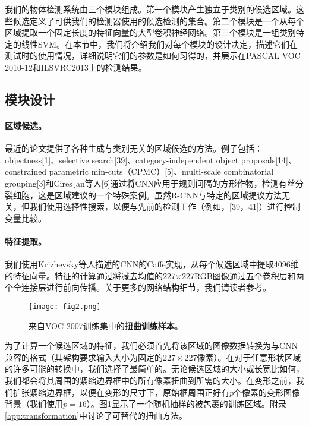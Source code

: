 \documentclass[../main.tex]{subfile}
\begin{document}
我们的物体检测系统由三个模块组成。第一个模块产生独立于类别的候选区域。这些候选定义了可供我们的检测器使用的候选检测的集合。第二个模块是一个从每个区域提取一个固定长度的特征向量的大型卷积神经网络。第三个模块是一组类别特定的线性SVM。在本节中，我们将介绍我们对每个模块的设计决定，描述它们在测试时的使用情况，详细说明它们的参数是如何习得的，并展示在PASCAL VOC 2010-12和ILSVRC2013上的检测结果。

\subsection{模块设计}

\paragraph{区域候选。}最近的论文提供了各种生成与类别无关的区域候选的方法。例子包括：objectness[1]、selective search[39]、category-independent object proposals[14]、constrained parametric min-cuts（CPMC）[5]、multi-scale combinatorial grouping[3]和Cires¸an等人[6]通过将CNN应用于规则间隔的方形作物，检测有丝分裂细胞，这是区域建议的一个特殊案例。虽然R-CNN与特定的区域提议方法无关，但我们使用选择性搜索，以便与先前的检测工作（例如，[39，41]）进行控制变量比较。

\paragraph{特征提取。}我们使用Krizhevsky等人\cite{alexnet}描述的CNN的Caffe\cite{caffe}实现，从每个候选区域中提取4096维的特征向量。特征的计算通过将减去均值的227×227RGB图像通过五个卷积层和两个全连接层进行前向传播。关于更多的网络结构细节，我们请读者参考\cite{alexnet, caffe}。

\begin{figure}[htb]
    \centering
    \texttt{[image: fig2.png]}
    \caption{来自VOC 2007训练集中的\textbf{扭曲训练样本}。}
    \label{fig:fig2}
\end{figure}

为了计算一个候选区域的特征，我们必须首先将该区域的图像数据转换为与CNN兼容的格式（其架构要求输入大小为固定的$227 \times 227$像素）。在对于任意形状区域的许多可能的转换中，我们选择了最简单的。无论候选区域的大小或长宽比如何，我们都会将其周围的紧缩边界框中的所有像素扭曲到所需的大小。在变形之前，我们扩张紧缩边界框，以便在变形的尺寸下，原始框周围正好有$p$个像素的变形图像背景（我们使用$p=16$）。图\ref{fig:fig2}显示了一个随机抽样的被包裹的训练区域。附录\ref{app:transformation}中讨论了可替代的扭曲方法。
\end{document}
